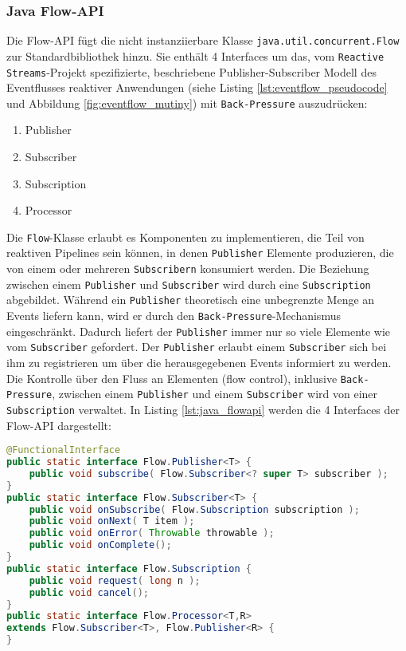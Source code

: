 \subsubsection{Java Flow-API}
\label{subsection:java_flow_api}
Die Flow-API fügt die nicht instanziierbare Klasse \verb|java.util.concurrent.Flow| zur Standardbibliothek hinzu.
Sie enthält 4 Interfaces um das, vom \verb|Reactive Streams|-Projekt spezifizierte, beschriebene Publisher-Subscriber Modell des Eventflusses
reaktiver Anwendungen (siehe Listing \ref{lst:eventflow_pseudocode} und Abbildung \ref{fig:eventflow_mutiny}) mit \verb|Back-Pressure| auszudrücken:

\begin{enumerate}
  \item Publisher
  \item Subscriber
  \item Subscription
  \item Processor
\end{enumerate}

Die \verb|Flow|-Klasse erlaubt es Komponenten zu implementieren, die Teil von reaktiven Pipelines sein können, in denen
\verb|Publisher| Elemente produzieren, die von einem oder mehreren \verb|Subscribern| konsumiert werden.
Die Beziehung zwischen einem \verb|Publisher| und \verb|Subscriber| wird durch eine \verb|Subscription| abgebildet.
Während ein \verb|Publisher| theoretisch eine unbegrenzte Menge an Events liefern kann, wird er durch den \verb|Back-Pressure|-Mechanismus eingeschränkt.
Dadurch liefert der \verb|Publisher| immer nur so viele Elemente wie vom \verb|Subscriber| gefordert.
Der \verb|Publisher| erlaubt einem \verb|Subscriber| sich bei ihm zu registrieren um über die herausgegebenen Events informiert zu werden.
Die Kontrolle über den Fluss an Elementen (flow control), inklusive \verb|Back-Pressure|, zwischen einem \verb|Publisher| und einem \verb|Subscriber|
wird von einer \verb|Subscription| verwaltet.
In Listing \ref{lst:java_flowapi} werden die 4 Interfaces der Flow-API dargestellt:
\begin{lstlisting}[language=java, caption=Die Klasse java.util.concurrent.Flow, captionpos=b, label=lst:java_flowapi]
@FunctionalInterface
public static interface Flow.Publisher<T> {
	public void subscribe( Flow.Subscriber<? super T> subscriber );
}
public static interface Flow.Subscriber<T> {
	public void onSubscribe( Flow.Subscription subscription );
	public void onNext( T item );
	public void onError( Throwable throwable );
	public void onComplete();
}
public static interface Flow.Subscription {
	public void request( long n );
	public void cancel();
}
public static interface Flow.Processor<T,R>
extends Flow.Subscriber<T>, Flow.Publisher<R> {
}
\end{lstlisting}\parencite[Kapitel 5.11]{JavaSE9StandardBibliothek}

